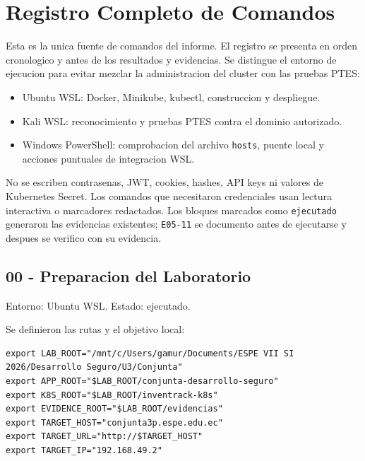\section{Registro Completo de Comandos}\label{registro-completo-de-comandos}

Esta es la unica fuente de comandos del informe. El registro se presenta en orden cronologico y antes de los resultados y evidencias. Se distingue el entorno de ejecucion para evitar mezclar la administracion del cluster con las pruebas PTES:

\begin{itemize}
\tightlist
\item
  Ubuntu WSL: Docker, Minikube, kubectl, construccion y despliegue.
\item
  Kali WSL: reconocimiento y pruebas PTES contra el dominio autorizado.
\item
  Windows PowerShell: comprobacion del archivo \texttt{hosts}, puente local y acciones puntuales de integracion WSL.
\end{itemize}

No se escriben contrasenas, JWT, cookies, hashes, API keys ni valores de Kubernetes Secret. Los comandos que necesitaron credenciales usan lectura interactiva o marcadores redactados. Los bloques marcados como \texttt{ejecutado} generaron las evidencias existentes; \texttt{E05-11} se documento antes de ejecutarse y despues se verifico con su evidencia.

\subsection{00 - Preparacion del Laboratorio}\label{00---preparacion-del-laboratorio}

Entorno: Ubuntu WSL. Estado: ejecutado.

Se definieron las rutas y el objetivo local:

\begin{tcolorbox}[codebox]
\begin{Verbatim}[fontsize=\scriptsize,breaklines=true,breakanywhere=true]
export LAB_ROOT="/mnt/c/Users/gamur/Documents/ESPE VII SI 2026/Desarrollo Seguro/U3/Conjunta"
export APP_ROOT="$LAB_ROOT/conjunta-desarrollo-seguro"
export K8S_ROOT="$LAB_ROOT/inventrack-k8s"
export EVIDENCE_ROOT="$LAB_ROOT/evidencias"
export TARGET_HOST="conjunta3p.espe.edu.ec"
export TARGET_URL="http://$TARGET_HOST"
export TARGET_IP="192.168.49.2"
\end{Verbatim}
\end{tcolorbox}

